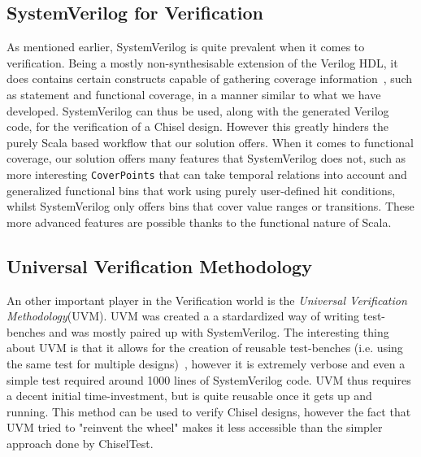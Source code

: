 \documentclass[conference]{IEEEtran}
\begin{document}
\subsection{SystemVerilog for Verification}
As mentioned earlier, SystemVerilog is quite prevalent when it comes to verification. Being a mostly non-synthesisable extension of the Verilog HDL, it does contains certain constructs capable of gathering coverage information~\cite{spear2008systemverilog}, such as statement and functional coverage, in a manner similar to what we have developed. SystemVerilog can thus be used, along with the generated Verilog code, for the verification of a Chisel design. However this greatly hinders the purely Scala based workflow that our solution offers. When it comes to functional coverage, our solution offers many features that SystemVerilog does not, such as more interesting \texttt{CoverPoints} that can take temporal relations into account and generalized functional bins that work using purely user-defined hit conditions, whilst SystemVerilog only offers bins that cover value ranges or transitions. These more advanced features are possible thanks to the functional nature of Scala. 

\subsection{Universal Verification Methodology}
An other important player in the Verification world is the \textit{Universal Verification Methodology}(UVM). UVM was created a a stardardized way of writing test-benches and was mostly paired up with SystemVerilog. The interesting thing about UVM is that it allows for the creation of reusable test-benches (i.e. using the same test for multiple designs)~\cite{uvm2015}, however it is extremely verbose and even a simple test required around 1000 lines of SystemVerilog code. UVM thus requires a decent initial time-investment, but is quite reusable once it gets up and running. This method can be used to verify Chisel designs, however the fact that UVM tried to "reinvent the wheel" makes it less accessible than the simpler approach done by ChiselTest.
\end{document}
